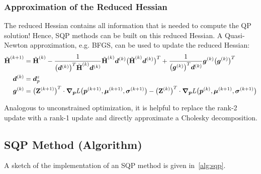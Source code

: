 			\subsubsection{Approximation of the Reduced Hessian}
				The reduced Hessian contains all information that is needed to compute the QP solution! Hence, SQP methods can be built on this reduced Hessian. A Quasi-Newton approximation, e.g. BFGS, can be used to update the reduced Hessian:
				\begin{align*}
					\tilde{\bm{\mathrm{H}}}^{(k + 1)} & = \tilde{\bm{\mathrm{H}}}^{(k)}
					- \frac{1}{\big(\bm{d}^{(k)}\big)^T \tilde{\bm{\mathrm{H}}}^{(k)} \bm{d}^{(k)}} \tilde{\bm{\mathrm{H}}}^{(k)} \bm{d}^{(k)} \big(\tilde{\bm{\mathrm{H}}}^{(k)} \bm{d}^{(k)}\big)^T
					+ \frac{1}{\big(\bm{g}^{(k)}\big)^T \bm{d}^{(k)}} \bm{g}^{(k)} \big(\bm{g}^{(k)}\big)^T                                                                                                                                                                                       \\
					\bm{d}^{(k)}             & = \bm{d}_p^z                                                                                                                                                                                                                                         \\
					\bm{g}^{(k)}             & = \big(\bm{\mathrm{Z}}^{(k + 1)}\big)^T \cdot \grad_{\bm{p}}L\big(\bm{p}^{(k + 1)}, \bm{\mu}^{(k + 1)}, \bm{\sigma}^{(k + 1)}\big) - \big(\bm{\mathrm{Z}}^{(k)}\big)^T \cdot \grad_{\bm{p}}L\big(\bm{p}^{(k)}, \bm{\mu}^{(k + 1)}, \bm{\sigma}^{(k + 1)}\big)
				\end{align*}

				Analogous to unconstrained optimization, it is helpful to replace the rank-2 update with a rank-1 update and directly approximate a Cholesky decomposition.

		\subsection{SQP Method (Algorithm)}
			A sketch of the implementation of an SQP method is given in~\autoref{alg:sqp}.

